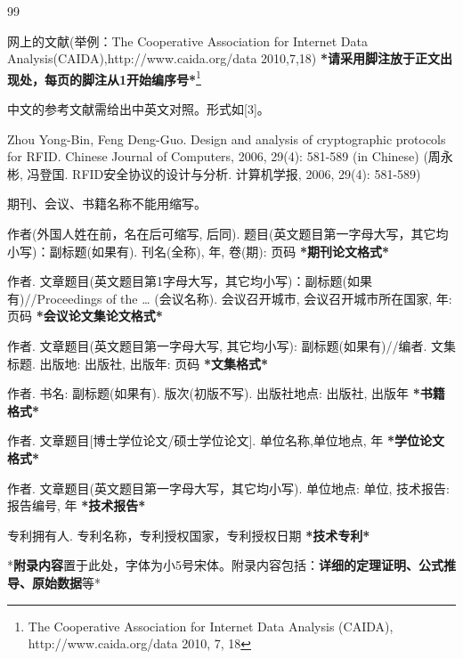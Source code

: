 \documentclass[10.5pt,compsoc]{CjC}
\theoremstyle{mystyle}
\let\temp\footnote
\renewcommand \footnote[1]{\temp{\zihao{-5}#1}}
\begin{document}
\begin{thebibliography}{99}
	 \addtolength{\itemsep}{-1em}
	\vspace {1.5mm}
	
	网上的文献(举例：The Cooperative
	Association for Internet Data Analysis(CAIDA),http://www.caida.org/data
	2010,7,18) \textbf{*请采用脚注放于正文出现处，每页的脚注从1开始编序号*}\footnote{The Cooperative Association for Internet Data
		Analysis (CAIDA), http://www.caida.org/data 2010, 7, 18}
	
	 中文的参考文献需给出中英文对照。形式如[3]。
	
	 Zhou Yong-Bin, Feng Deng-Guo. Design and analysis of cryptographic
	protocols for RFID. Chinese Journal of Computers, 2006, 29(4): 581-589 (in
	Chinese) \newline
	(周永彬, 冯登国. RFID安全协议的设计与分析. 计算机学报, 2006, 29(4): 581-589)
	
	 期刊、会议、书籍名称不能用缩写。
	
	 作者(外国人姓在前，名在后可缩写, 后同).
	题目(英文题目第一字母大写，其它均小写)：副标题(如果有). 刊名(全称), 年,
	卷(期): 页码 \textbf{*期刊论文格式*}
	
	作者.
	文章题目(英文题目第1字母大写，其它均小写)：副标题(如果有)//Proceedings of
	the {\ldots} (会议名称). 会议召开城市, 会议召开城市所在国家, 年: 页码
	\textbf{*会议论文集论文格式*}
	
	作者. 文章题目(英文题目第一字母大写, 其它均小写):
	副标题(如果有)//编者. 文集标题. 出版地: 出版社, 出版年: 页码
	\textbf{*文集格式*}
	
	作者. 书名: 副标题(如果有). 版次(初版不写). 出版社地点: 出版社,
	出版年 \textbf{*书籍格式*}
	
	作者. 文章题目[博士学位论文/硕士学位论文]. 单位名称,单位地点, 年
	\textbf{*学位论文格式*}
	
	作者. 文章题目(英文题目第一字母大写，其它均小写). 单位地点: 单位,
	技术报告: 报告编号, 年 \textbf{*技术报告*}
	
	专利拥有人. 专利名称，专利授权国家，专利授权日期
	\textbf{*技术专利*}
\end{thebibliography}


{\setlength\parindent{2em}
	*\textbf{附录内容}置于此处，字体为小5号宋体。附录内容包括：\textbf{详细的定理证明、公式推导、原始数据}等*}
\end{document}
